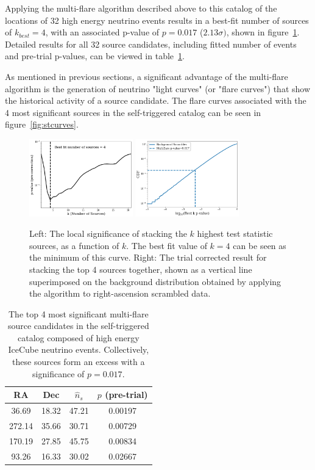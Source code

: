 Applying the multi-flare algorithm described above to this catalog of the locations of 32 high energy neutrino events results in a best-fit number of sources of $k_{best}=4$, with an associated p-value of $p=0.017$ ($2.13\sigma)$, shown in figure~\ref{fig:stresults}. Detailed results for all 32 source candidates, including fitted number of events and pre-trial p-values, can be viewed in table~\ref{tab:stresults}. 

As mentioned in previous sections, a significant advantage of the multi-flare algorithm is the generation of neutrino "light curves" (or "flare curves") that show the historical activity of a source candidate. The flare curves associated with the 4 most significant sources in the self-triggered catalog can be seen in figure~\ref{fig:stcurves}.

\begin{figure}[h]
\centering
\includegraphics[width=0.4\textwidth]{figs/st_pcurve.png}
\includegraphics[width=0.4\textwidth]{figs/st_obsresult.png}
\caption{Left: The local significance of stacking the $k$ highest test statistic sources, as a function of $k$. The best fit value of $k=4$ can be seen as the minimum of this curve. Right: The trial corrected result for stacking the top 4 sources together, shown as a vertical line superimposed on the background distribution obtained by applying the algorithm to right-ascension scrambled data.}
\label{fig:stresults}
\end{figure}

\begin{table}[h!]
\centering
 \begin{tabular}{||c c c c||} 
 \hline
 RA & Dec & $\hat{n}_s$ & $p$ (pre-trial) \\ [0.5ex] 
 \hline\hline
 36.69 & 18.32 & 47.21 & 0.00197 \\ 
 \hline
 272.14 & 35.66 & 30.71 & 0.00729 \\
 \hline
 170.19 & 27.85 & 45.75 & 0.00834 \\
 \hline
 93.26 & 16.33 & 30.02 & 0.02667 \\
 \hline
\end{tabular}
\caption{The top 4 most significant multi-flare source candidates in the self-triggered catalog composed of high energy IceCube neutrino events. Collectively, these sources form an excess with a significance of $p=0.017$.}
\label{tab:stresults}
\end{table}


